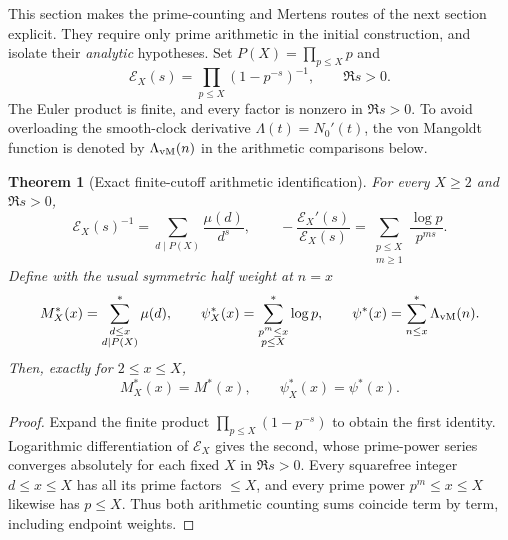 \documentclass[11pt,reqno]{amsart}
\numberwithin{equation}{section}
\newtheorem{theorem}{Theorem}[section]
\begin{document}
This section makes the prime-counting and Mertens routes of the
next section explicit.  They require only prime arithmetic in the
initial construction, and isolate their \emph{analytic} hypotheses.
Set $P(X)=\prod_{p\le X}p$ and
\begin{equation}\label{eq:EulerFixed}
 \mathscr E_X(s)=\prod_{p\le X}(1-p^{-s})^{-1},\qquad \Re s>0.
\end{equation}
The Euler product is finite, and every factor is nonzero in
$\Re s>0$.  To avoid overloading the smooth-clock derivative
$\Lambda(t)=N_0'(t)$, the von Mangoldt function is denoted by
$\Lambda_{\rm vM}(n)$ in the arithmetic comparisons below.

\begin{theorem}[Exact finite-cutoff arithmetic identification]
\label{thm:Eulerarith}
For every $X\ge2$ and $\Re s>0$,
\begin{equation}\label{eq:EulerMcoeff}
 \mathscr E_X(s)^{-1}=\sum_{d\mid P(X)}\frac{\mu(d)}{d^s},
 \qquad
 -\frac{\mathscr E_X'(s)}{\mathscr E_X(s)}=
 \sum_{\substack{p\le X\\m\ge1}}\frac{\log p}{p^{ms}}.
\end{equation}
Define with the usual symmetric half weight at $n=x$
\[
 M_X^*(x)=\sum_{\substack{d\le x\\d\mid P(X)}}^{*}\mu(d),
\qquad
 \psi_X^*(x)=\sum_{\substack{p^m\le x\\p\le X}}^{*}\log p,\qquad\psi^*(x)=\sum_{n\le x}^{*}\Lambda_{\rm vM}(n).
\]
Then, exactly for $2\le x\le X$,
\begin{equation}\label{eq:arithidentity}
  M_X^*(x)=M^*(x),\qquad \psi_X^*(x)=\psi^*(x).
\end{equation}
\end{theorem}
\begin{proof}
Expand the finite product $\prod_{p\le X}(1-p^{-s})$ to obtain the
first identity.  Logarithmic differentiation of $\mathscr E_X$ gives the second,
whose prime-power series converges absolutely for each fixed $X$
in $\Re s>0$.  Every squarefree integer $d\le x\le X$ has all its
prime factors $\le X$, and every prime power $p^m\le x\le X$
likewise has $p\le X$. Thus both arithmetic counting sums coincide
term by term, including endpoint weights.
\end{proof}
\end{document}
